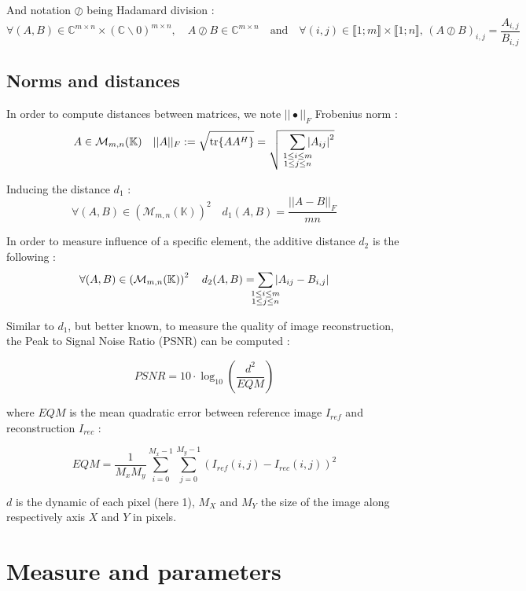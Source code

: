 \documentclass[titlepage]{article}
\newcommand{\fnorm}[1]{|\vert#1|\vert_{F}} %
\begin{document}
	And notation $\oslash$ being Hadamard division :
	$$
	\forall (A,B)\in\mathbb{C}^{m\times n}\times\left(\mathbb{C}\backslash0\right)^{m\times n}, \quad A\oslash B\in\mathbb{C}^{m\times n} \quad\text{and}\quad \forall (i,j)\in\llbracket1;m\rrbracket\times\llbracket1;n\rrbracket,\, (A\oslash B)_{i,j} = \frac{A_{i,j}}{B_{i,j}}
	$$
	
	\subsection{Norms and distances}
	
	In order to compute distances between matrices, we note $\fnorm{\bullet}$ Frobenius norm :
	$$
	A\in\mathcal{M}_{m,n}(\mathbb{K}) \quad \fnorm{A} := \sqrt{\tr{AA^H}} = \sqrt{
		\;\;\;\sum_{
			\mathclap{
				\substack{
					1\le i\le m \\1\le j\le n
				}
			}
		}\abs{A_{ij}}^2}
	$$
	
	Inducing the distance $d_1$ :
	$$
	\forall(A,B)\in\left(\mathcal{M}_{m,n}(\mathbb{K})\right)^2\quad d_1(A,B) = \frac{\fnorm{A-B}}{mn}
	$$
	
	In order to measure influence of a specific element, the additive distance $d_2$ is the following :
	$$
	\forall(A,B)\in\left(\mathcal{M}_{m,n}(\mathbb{K})\right)^2\quad d_2(A,B) = \sum_{
		\mathclap{
			\substack{
				1\le i\le m \\1\le j\le n
			}
		}
	}\abs{A_{ij} - B_{i,j}}
	$$
	
	Similar to $d_1$, but better known, to measure the quality of image reconstruction, the Peak to Signal Noise Ratio (PSNR) can be computed :
	
	$$
		PSNR = 10\cdot\log_{10}\left(\frac{d^2}{EQM}\right)
	$$
	
	where $EQM$ is the mean quadratic error between reference image $I_{ref}$ and reconstruction $I_{rec}$ :
	
	$$
		EQM = \frac{1}{M_xM_y}\sum_{i=0}^{M_x-1}\sum_{j=0}^{M_y-1}( I_{ref}(i,j) - I_{rec}(i,j) )^2
	$$
	
	$d$ is the dynamic of each pixel (here 1), $M_X$ and $M_Y$ the size of the image along respectively axis $X$ and $Y$ in pixels. 
	
	\section{Measure and parameters}
	
\end{document}
